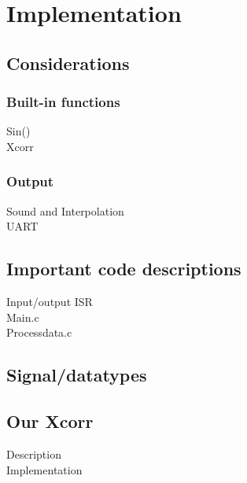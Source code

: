 \chapter{Implementation}
\section{Considerations}
\subsection{Built-in functions}
Sin()\\
Xcorr\\
\subsection{Output}
Sound and Interpolation\\
UART\\
\section{Important code descriptions}
Input/output ISR\\
Main.c\\
Processdata.c\\
\section{Signal/datatypes}
\section{Our Xcorr}
Description\\
Implementation\\